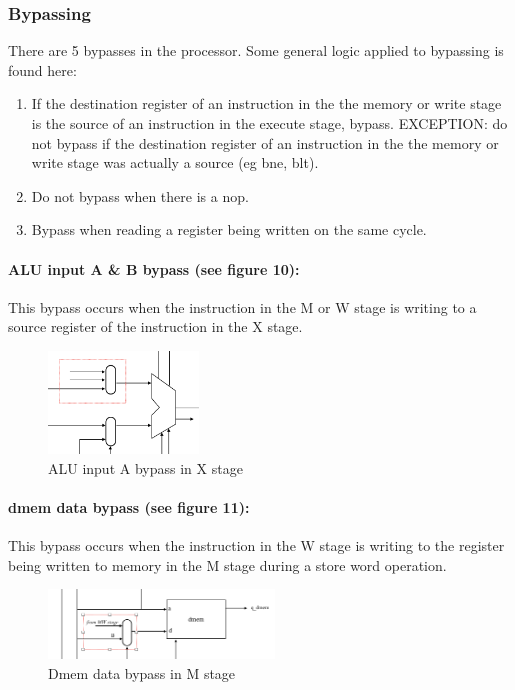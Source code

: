 \documentclass[letterpaper]{article}
\begin{document}
\subsubsection{Bypassing}
There are 5 bypasses in the processor. Some general logic applied to bypassing is found here:
\begin{enumerate}
    \item If the destination register of an instruction in the the memory or write stage is the source of an instruction in the execute stage, bypass. EXCEPTION: do not bypass if the destination register of an instruction in the the memory or write stage was actually a source (eg bne, blt).
    \item Do not bypass when there is a nop.
    \item Bypass when reading a register being written on the same cycle.
\end{enumerate}
\paragraph{ALU input A \& B bypass (see figure 10):} This bypass occurs when the instruction in the M or W stage is writing to a source register of the instruction in the X stage.
\begin{figure}[h]
    \centering
    \includegraphics[width=4cm]{ALUinbypass.png}
    \caption{ALU input A bypass in X stage}
    \label{fig:my_label}
\end{figure}

\paragraph{dmem data bypass (see figure 11):} This bypass occurs when the instruction in the W stage is writing to the register being written to memory in the M stage during a store word operation.
\begin{figure}[h]
    \centering
    \includegraphics[width=6cm]{dmemdatabypass.png}
    \caption{Dmem data bypass in M stage}
    \label{fig:my_label}
\end{figure}
\end{document}
